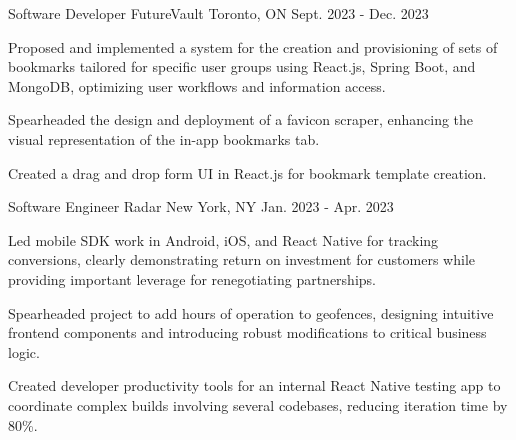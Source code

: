 

\begin{cventries}

  \cventry
    {Software Developer} %
    {FutureVault} %
    {Toronto, ON} %
    {Sept. 2023 - Dec. 2023} %
    {
      \begin{cvitems} %
        \item {Proposed and implemented a system for the creation and provisioning of sets of bookmarks tailored for specific user groups using React.js, Spring Boot, and MongoDB, optimizing user workflows and information access.}
        \item {Spearheaded the design and deployment of a favicon scraper, enhancing the visual representation of the in-app bookmarks tab.}
        \item {Created a drag and drop form UI in React.js for bookmark template creation.}
      \end{cvitems}
    }

  \cventry
    {Software Engineer} %
    {Radar} %
    {New York, NY} %
    {Jan. 2023 - Apr. 2023} %
    {
      \begin{cvitems} %
        \item {Led mobile SDK work in Android, iOS, and React Native for tracking conversions, clearly demonstrating return on investment for customers while providing important leverage for renegotiating partnerships.}
        \item {Spearheaded project to add hours of operation to geofences, designing intuitive frontend components and introducing robust modifications to critical business logic.}
        \item {Created developer productivity tools for an internal React Native testing app to coordinate complex builds involving several codebases, reducing iteration time by 80\%.}
      \end{cvitems}
    }


\end{cventries}
